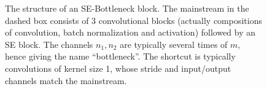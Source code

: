 \begin{figure}
\begin{tikzpicture}
\end{tikzpicture}

\caption{The structure of an SE-Bottleneck block. The mainstream in the dashed box consists of 3 convolutional blocks (actually compositions of convolution, batch normalization and activation) followed by an SE block. The channels $n_1, n_2$ are typically several times of $m,$ hence giving the name ``bottleneck''. The shortcut is typically convolutions of kernel size 1, whose stride and input/output channels match the mainstream.}
\label{fig:se_bottleneck}
\end{figure}
